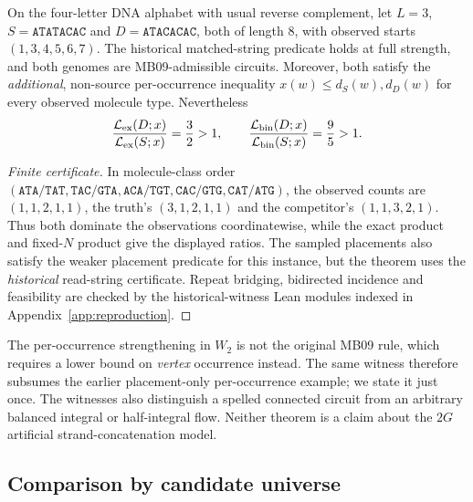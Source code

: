 \begin{theorem}
\label{thm:cex-historical-W2}
On the four-letter DNA alphabet with usual reverse
complement, let $L=3$, $S=\texttt{ATATACAC}$ and
$D=\texttt{ATACACAC}$, both of length $8$, with
observed starts $(1,3,4,5,6,7)$.
The historical matched-string predicate holds at full
strength, and both genomes are MB09-admissible circuits.
Moreover, both satisfy the \emph{additional}, non-source
per-occurrence inequality $x(w)\le d_S(w),d_D(w)$
for every observed molecule type. Nevertheless
\[
 \frac{\mathcal{L}_{\mathrm{ex}}(D;x)}{\mathcal{L}_{\mathrm{ex}}(S;x)}
 =\frac32>1,\qquad
 \frac{\mathcal{L}_{\mathrm{bin}}(D;x)}{\mathcal{L}_{\mathrm{bin}}(S;x)}
 =\frac95>1.
\]
\end{theorem}
\begin{proof}[Finite certificate]
In molecule-class order
$(\texttt{ATA/TAT},\texttt{TAC/GTA},
  \texttt{ACA/TGT},\texttt{CAC/GTG},\texttt{CAT/ATG})$,
the observed counts are $(1,1,2,1,1)$,
the truth's $(3,1,2,1,1)$ and the competitor's
$(1,1,3,2,1)$. Thus both dominate the observations
coordinatewise, while the exact product and fixed-$N$
product give the displayed ratios. The sampled placements
also satisfy the weaker placement predicate for this
instance, but the theorem uses the \emph{historical}
read-string certificate. Repeat bridging, bidirected incidence and feasibility
are checked by the historical-witness Lean modules
indexed in Appendix~\ref{app:reproduction}.
\end{proof}

The per-occurrence strengthening in $W_2$ is not the
original MB09 rule, which requires a lower bound on
\emph{vertex} occurrence instead. The same witness
therefore subsumes the earlier placement-only
per-occurrence example; we state it just once.
The witnesses also distinguish a spelled connected
circuit from an arbitrary balanced integral or
half-integral flow. Neither theorem is a claim about
the $2G$ artificial strand-concatenation model.

\subsection{Comparison by candidate universe}

